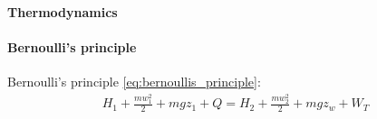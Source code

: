 \documentclass[class=article, crop=false]{standalone}
\begin{document}
\paragraph{Thermodynamics}


\paragraph{Bernoulli's principle}
Bernoulli's principle \ref{eq:bernoullis_principle}:
\begin{align}
    H_1 + \frac{mw_1^2}{2} + mgz_1 + Q = H_2 + \frac{mw_2^2}{2} + mgz_w +
    W_T
    \label{eq:bernoullis_principle}
\end{align}
\end{document}
